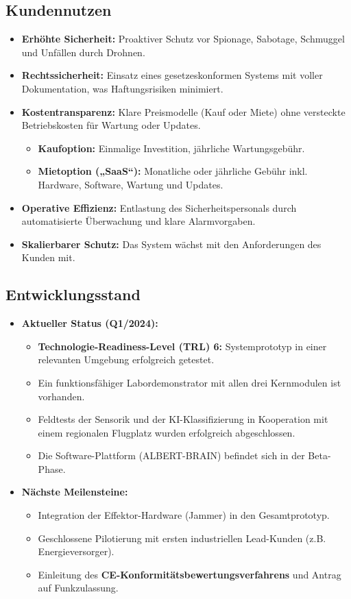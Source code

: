 \documentclass[11pt,a4paper]{article}
\begin{document}
\subsection{Kundennutzen}
\begin{itemize}
    \item \textbf{Erhöhte Sicherheit:} Proaktiver Schutz vor Spionage, Sabotage, Schmuggel und Unfällen durch Drohnen.
    \item \textbf{Rechtssicherheit:} Einsatz eines gesetzeskonformen Systems mit voller Dokumentation, was Haftungsrisiken minimiert.
    \item \textbf{Kostentransparenz:} Klare Preismodelle (Kauf oder Miete) ohne versteckte Betriebskosten für Wartung oder Updates.
    \begin{itemize}
        \item \textbf{Kaufoption:} Einmalige Investition, jährliche Wartungsgebühr.
        \item \textbf{Mietoption („SaaS“):} Monatliche oder jährliche Gebühr inkl. Hardware, Software, Wartung und Updates.
    \end{itemize}
    \item \textbf{Operative Effizienz:} Entlastung des Sicherheitspersonals durch automatisierte Überwachung und klare Alarmvorgaben.
    \item \textbf{Skalierbarer Schutz:} Das System wächst mit den Anforderungen des Kunden mit.
\end{itemize}

\subsection{Entwicklungsstand}
\begin{itemize}
    \item \textbf{Aktueller Status (Q1/2024):}
    \begin{itemize}
        \item \textbf{Technologie-Readiness-Level (TRL) 6:} Systemprototyp in einer relevanten Umgebung erfolgreich getestet.
        \item Ein funktionsfähiger Labordemonstrator mit allen drei Kernmodulen ist vorhanden.
        \item Feldtests der Sensorik und der KI-Klassifizierung in Kooperation mit einem regionalen Flugplatz wurden erfolgreich abgeschlossen.
        \item Die Software-Plattform (ALBERT-BRAIN) befindet sich in der Beta-Phase.
    \end{itemize}
    
    \item \textbf{Nächste Meilensteine:}
    \begin{itemize}
        \item Integration der Effektor-Hardware (Jammer) in den Gesamtprototyp.
        \item Geschlossene Pilotierung mit ersten industriellen Lead-Kunden (z.B. Energieversorger).
        \item Einleitung des \textbf{CE-Konformitätsbewertungsverfahrens} und Antrag auf Funkzulassung.
    \end{itemize}
\end{itemize}
\end{document}
